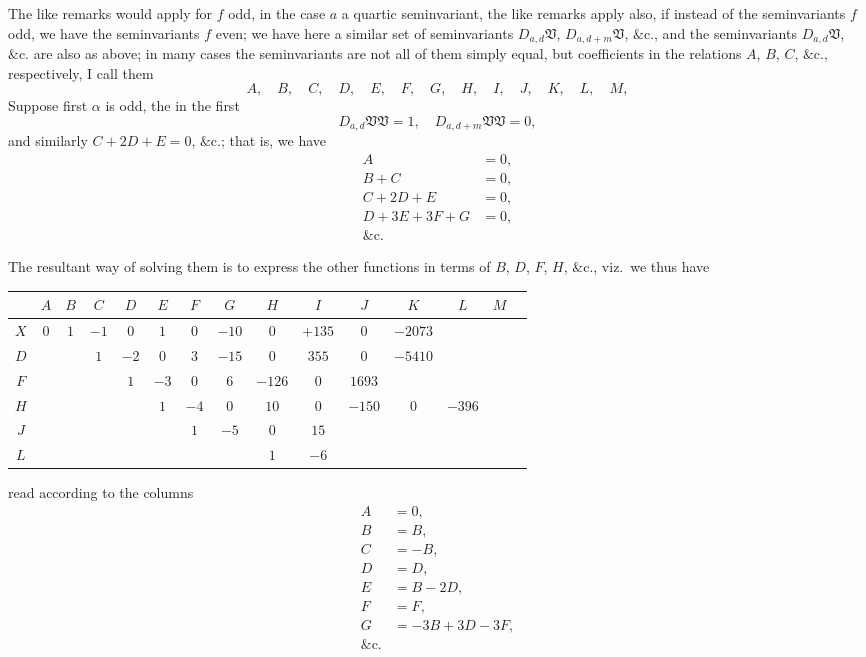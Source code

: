 \documentclass[11pt,a4paper]{book}
\begin{document}
The like remarks would apply for $f$ odd, in the case $a$ a quartic seminvariant, the like remarks apply also, if instead of the seminvariants $f$ odd, we have the seminvariants $f$ even; we have here a similar set of seminvariants $D_{a,d}\mathfrak{V}$, $D_{a,d+m}\mathfrak{V}$, $\&\text{c.}$, and the seminvariants $D_{a,d}\mathfrak{V}$, $\&\text{c.}$ are also as above; in many cases the seminvariants are not all of them simply equal, but coefficients in the relations $A$, $B$, $C$, $\&\text{c.}$, respectively, I call them
\[
A, \quad B, \quad C, \quad D, \quad E, \quad F, \quad G, \quad H, \quad I, \quad J, \quad K, \quad L, \quad M,
\]
Suppose first $\alpha$ is odd, the in the first
\[
D_{a,d}\mathfrak{V}\mathfrak{V} = 1, \quad D_{a,d+m}\mathfrak{V}\mathfrak{V} = 0,
\]
and similarly $C + 2D + E = 0$, $\&\text{c.}$; that is, we have
\begin{align*}
A &= 0, \\
B + C &= 0, \\
C + 2D + E &= 0, \\
D + 3E + 3F + G &= 0, \\
\&\text{c.}
\end{align*}

The resultant way of solving them is to express the other functions in terms of $B$, $D$, $F$, $H$, $\&\text{c.}$, viz.\ we thus have

\medskip
\begin{center}
\begin{tabular}{c|cccccccccccccc}
& $A$ & $B$ & $C$ & $D$ & $E$ & $F$ & $G$ & $H$ & $I$ & $J$ & $K$ & $L$ & $M$ & \\
\hline
$X$ & $0$ & $1$ & $-1$ & $0$ & $1$ & $0$ & $-10$ & $0$ & $+135$ & $0$ & $-2073$ & & & \\
$D$ & & & $1$ & $-2$ & $0$ & $3$ & $-15$ & $0$ & $355$ & $0$ & $-5410$ & & & \\
$F$ & & & & $1$ & $-3$ & $0$ & $6$ & $-126$ & $0$ & $1693$ & & & & \\
$H$ & & & & & $1$ & $-4$ & $0$ & $10$ & $0$ & $-150$ & $0$ & $-396$ & & \\
$J$ & & & & & & $1$ & $-5$ & $0$ & $15$ & & & & & \\
$L$ & & & & & & & & $1$ & $-6$ & & & & &
\end{tabular}
\end{center}
\medskip

read according to the columns
\begin{align*}
A &= 0, \\
B &= B, \\
C &= -B, \\
D &= D, \\
E &= B - 2D, \\
F &= F, \\
G &= -3B + 3D - 3F, \\
\&\text{c.}
\end{align*}
\end{document}
